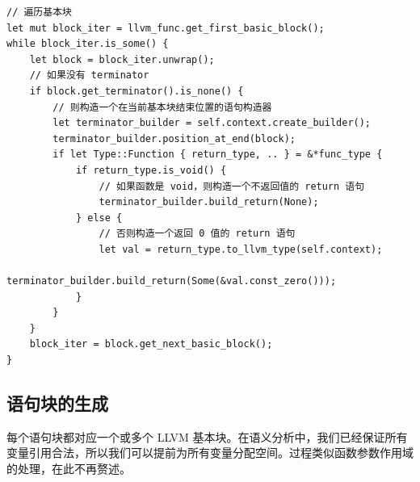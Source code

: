 \documentclass{ctexrep}
\begin{document}
\begin{verbatim}
// 遍历基本块
let mut block_iter = llvm_func.get_first_basic_block();
while block_iter.is_some() {
    let block = block_iter.unwrap();
    // 如果没有 terminator
    if block.get_terminator().is_none() {
        // 则构造一个在当前基本块结束位置的语句构造器
        let terminator_builder = self.context.create_builder();
        terminator_builder.position_at_end(block);
        if let Type::Function { return_type, .. } = &*func_type {
            if return_type.is_void() {
                // 如果函数是 void，则构造一个不返回值的 return 语句
                terminator_builder.build_return(None);
            } else {
                // 否则构造一个返回 0 值的 return 语句
                let val = return_type.to_llvm_type(self.context);
                terminator_builder.build_return(Some(&val.const_zero()));
            }
        }
    }
    block_iter = block.get_next_basic_block();
}
\end{verbatim}

\subsection{语句块的生成}
每个语句块都对应一个或多个 LLVM 基本块。在语义分析中，我们已经保证所有变量引用合法，所以我们可以提前为所有变量分配空间。过程类似函数参数作用域的处理，在此不再赘述。
\end{document}
